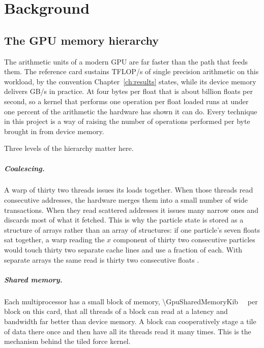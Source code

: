 \chapter{Background}
\label{ch:background}

\section{The GPU memory hierarchy}

The arithmetic units of a modern GPU are far faster than the path that feeds
them. The reference card sustains \TiledTflopsAtMaxN{} TFLOP/s of single precision
arithmetic on this workload, by the convention Chapter~\ref{ch:results} states, while its
device memory delivers \GpuMeasuredBandwidth{} GB/s in practice. At four bytes per float
that is about \MeasuredFloatsBillions{} billion floats per second, so a
kernel that performs one operation per float loaded runs at under one
percent of the arithmetic the hardware has shown it can do. Every technique in this
project is a way of raising the number of operations performed per byte
brought in from device memory.

Three levels of the hierarchy matter here.

\paragraph{Coalescing.} A warp of thirty two threads issues its loads together.
When those threads read consecutive addresses, the hardware merges them into a
small number of wide transactions. When they read scattered addresses it issues
many narrow ones and discards most of what it fetched. This is why the particle
state is stored as a structure of arrays rather than an array of structures: if
one particle's seven floats sat together, a warp reading the $x$ component of
thirty two consecutive particles would touch thirty two separate cache lines
and use a fraction of each. With separate arrays the same read is thirty two
consecutive floats \cite{cudaguide}.

\paragraph{Shared memory.} Each multiprocessor has a small block of memory,
\SI{\GpuSharedMemoryKib}{\kibi\byte} per block on this card, that all threads of a block can
read at a latency and bandwidth far better than device memory. A block can
cooperatively stage a tile of data there once and then have all its threads
read it many times. This is the mechanism behind the tiled force kernel.


